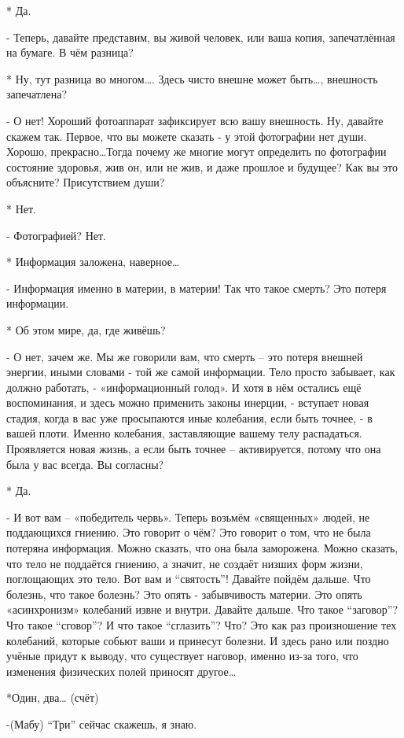 * Да.

- Теперь, давайте представим, вы живой человек, или  ваша копия, запечатлённая на бумаге. В чём разница?

* Ну, тут разница во многом…. Здесь чисто внешне может быть…, внешность запечатлена?

- О нет! Хороший фотоаппарат зафиксирует всю вашу внешность. Ну, давайте скажем так. Первое, что вы можете сказать - у этой фотографии нет души. Хорошо, прекрасно…Тогда почему же многие могут определить по фотографии состояние здоровья, жив он, или не жив, и даже прошлое и будущее? Как вы это объясните? Присутствием души?

* Нет.

- Фотографией? Нет.

* Информация заложена, наверное…

- Информация именно в материи, в материи! Так что такое смерть? Это потеря информации.

* Об этом мире, да, где живёшь?

- О нет, зачем же. Мы же говорили вам, что смерть – это потеря внешней энергии, иными словами - той же самой информации. Тело просто забывает, как должно работать, - «информационный голод». И хотя в нём   остались ещё воспоминания, и здесь можно применить законы инерции, - вступает новая стадия, когда в вас уже просыпаются иные колебания, если быть точнее, - в вашей плоти. Именно колебания,  заставляющие  вашему телу распадаться. Проявляется новая жизнь, а если быть точнее – активируется, потому что она  была у вас всегда. Вы согласны?

* Да.

- И вот вам – «победитель червь».  Теперь возьмём «священных» людей, не поддающихся гниению. Это говорит о чём? Это говорит о том, что не была потеряна информация. Можно сказать, что она была заморожена. Можно сказать, что тело не поддаётся гниению, а значит, не создаёт низших форм жизни, поглощающих это тело. Вот вам и “святость”! Давайте пойдём дальше. Что болезнь, что такое болезнь? Это опять - забывчивость материи. Это опять «асинхронизм» колебаний извне и внутри. Давайте дальше. Что такое “заговор”? Что такое “сговор”? И что такое “сглазить”? Что? Это как раз произношение тех колебаний, которые собьют ваши и принесут болезни. И здесь рано или поздно учёные придут к выводу, что существует наговор, именно из-за того, что изменения физических полей приносят другое…

*Один, два… (счёт)

-(Мабу)  “Три” сейчас скажешь, я знаю. 

